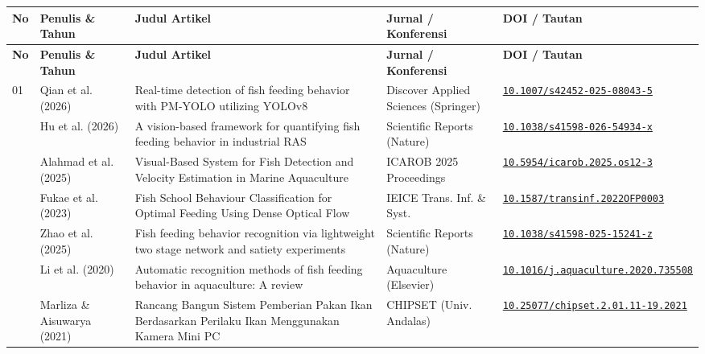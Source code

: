 \documentclass[11pt,a4paper]{article}
\begin{document}
\setlength{\tabcolsep}{3.5pt}
\begin{small}
\begin{longtable}{p{0.5cm} p{2.6cm} p{5.3cm} p{3.5cm} p{3.4cm}}
\toprule
\textbf{No} & \textbf{Penulis \& Tahun} & \textbf{Judul Artikel} & \textbf{Jurnal / Konferensi} & \textbf{DOI / Tautan} \\
\midrule
\endfirsthead
\toprule
\textbf{No} & \textbf{Penulis \& Tahun} & \textbf{Judul Artikel} & \textbf{Jurnal / Konferensi} & \textbf{DOI / Tautan} \\
\midrule
\endhead
\bottomrule
\endfoot

01 & Qian et al. (2026) & Real-time detection of fish feeding behavior with PM-YOLO utilizing YOLOv8 & Discover Applied Sciences (Springer) & \href{https://doi.org/10.1007/s42452-025-08043-5}{\footnotesize\nolinkurl{10.1007/s42452-025-08043-5}} \\
\addlinespace
02 & Hu et al. (2026) & A vision-based framework for quantifying fish feeding behavior in industrial RAS & Scientific Reports (Nature) & \href{https://doi.org/10.1038/s41598-026-54934-x}{\footnotesize\nolinkurl{10.1038/s41598-026-54934-x}} \\
\addlinespace
03 & Alahmad et al. (2025) & Visual-Based System for Fish Detection and Velocity Estimation in Marine Aquaculture & ICAROB 2025 Proceedings & \href{https://doi.org/10.5954/icarob.2025.os12-3}{\footnotesize\nolinkurl{10.5954/icarob.2025.os12-3}} \\
\addlinespace
04 & Fukae et al. (2023) & Fish School Behaviour Classification for Optimal Feeding Using Dense Optical Flow & IEICE Trans. Inf. \& Syst. & \href{https://doi.org/10.1587/transinf.2022OFP0003}{\footnotesize\nolinkurl{10.1587/transinf.2022OFP0003}} \\
\addlinespace
05 & Zhao et al. (2025) & Fish feeding behavior recognition via lightweight two stage network and satiety experiments & Scientific Reports (Nature) & \href{https://doi.org/10.1038/s41598-025-15241-z}{\footnotesize\nolinkurl{10.1038/s41598-025-15241-z}} \\
\addlinespace
06 & Li et al. (2020) & Automatic recognition methods of fish feeding behavior in aquaculture: A review & Aquaculture (Elsevier) & \href{https://doi.org/10.1016/j.aquaculture.2020.735508}{\footnotesize\nolinkurl{10.1016/j.aquaculture.2020.735508}} \\
\addlinespace
07 & Marliza \& Aisuwarya (2021) & Rancang Bangun Sistem Pemberian Pakan Ikan Berdasarkan Perilaku Ikan Menggunakan Kamera Mini PC & CHIPSET (Univ. Andalas) & \href{https://doi.org/10.25077/chipset.2.01.11-19.2021}{\footnotesize\nolinkurl{10.25077/chipset.2.01.11-19.2021}} \\

\end{longtable}
\end{small}
\end{document}
